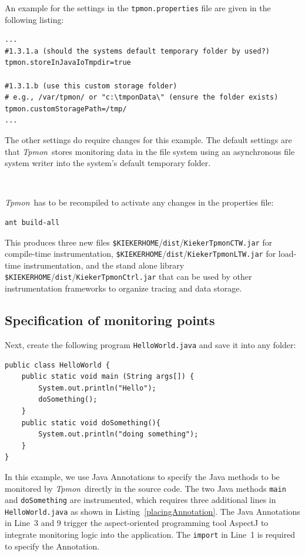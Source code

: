 \documentclass[a4paper,12pt]{scrartcl}
\newcommand{\tpmon}{\textit{Tpmon}}
\begin{document}
An example for the settings in the \texttt{tpmon.properties} file are given in the following listing:
\begin{lstlisting}[caption={Linux/Unix: Specification of the monitoring data storage location}]
...
#1.3.1.a (should the systems default temporary folder by used?)
tpmon.storeInJavaIoTmpdir=true

#1.3.1.b (use this custom storage folder)
# e.g., /var/tpmon/ or "c:\tmponData\" (ensure the folder exists)
tpmon.customStoragePath=/tmp/
...
\end{lstlisting}

The other settings do require changes for this example. The default settings are that \tpmon\ stores monitoring data in the file system using an asynchronous file system writer into the system's default temporary folder.

\

\tpmon\ has to be recompiled to activate any changes in the properties file:
\begin{lstlisting}[]
ant build-all
\end{lstlisting}
This produces three new files \texttt{\$KIEKERHOME}/\texttt{dist}/\texttt{KiekerTpmonCTW.jar} for compile-time instrumentation, \texttt{\$KIEKERHOME}/\texttt{dist}/\texttt{KiekerTpmonLTW.jar} for load-time instrumentation, and the stand alone library \texttt{\$KIEKERHOME}/\texttt{dist}/\texttt{KiekerTpmonCtrl.jar} that can be used by other instrumentation frameworks to organize tracing and data storage.

\subsection{Specification of monitoring points}\label{sec.tutorial.annotation}
Next, create the following program \texttt{HelloWorld.java} and save it into any folder:
\begin{lstlisting}[caption={\texttt{HelloWorld.java}},label={lst1}]
public class HelloWorld {	
	public static void main (String args[]) {
		System.out.println("Hello");
		doSomething();
	}
	public static void doSomething(){
		System.out.println("doing something");
	}
}
\end{lstlisting}

In this example, we use Java Annotations to specify the Java methods to be monitored by \tpmon\ directly in the source code. The two Java methods \texttt{main} and \texttt{doSomething} are instrumented, which requires three additional lines in \texttt{HelloWorld.java} as shown in Listing~\ref{placingAnnotation}. The Java Annotations in Line~3 and 9 trigger the aspect-oriented programming tool AspectJ to integrate monitoring logic into the application. The \texttt{import} in Line~1 is required to specify the Annotation.
\end{document}
